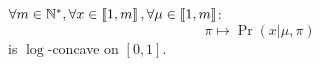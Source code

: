 % 
%         
% 
% 
%         
%         
%         
% 
%         
% 
% 

\begin{conjecture}
    $\forall m \in \mathbb{N}^*, \forall x \in \left\llbracket1, m\right\rrbracket, \forall \mu \in \left\llbracket1, m\right\rrbracket$:
    \[\pi \mapsto \Pr(x | \mu, \pi) \] 
    is $\log$-concave on $[0, 1]$.
\end{conjecture}

